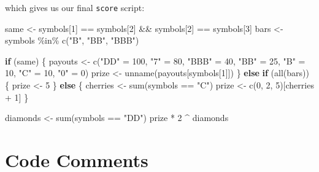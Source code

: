 \documentclass[
  letterpaper,
  DIV=11,
  numbers=noendperiod]{scrbook}
\newenvironment{Shaded}{\begin{snugshade}}{\end{snugshade}}
\newcommand{\ControlFlowTok}[1]{\textcolor[rgb]{0.00,0.23,0.31}{\textbf{#1}}}
\newcommand{\DecValTok}[1]{\textcolor[rgb]{0.68,0.00,0.00}{#1}}
\newcommand{\FunctionTok}[1]{\textcolor[rgb]{0.28,0.35,0.67}{#1}}
\newcommand{\NormalTok}[1]{\textcolor[rgb]{0.00,0.23,0.31}{#1}}
\newcommand{\OtherTok}[1]{\textcolor[rgb]{0.00,0.23,0.31}{#1}}
\newcommand{\SpecialCharTok}[1]{\textcolor[rgb]{0.37,0.37,0.37}{#1}}
\newcommand{\StringTok}[1]{\textcolor[rgb]{0.13,0.47,0.30}{#1}}
\begin{document}
which gives us our final \texttt{score} script:

\begin{Shaded}
\begin{Highlighting}[]
\NormalTok{same }\OtherTok{\textless{}{-}}\NormalTok{ symbols[}\DecValTok{1}\NormalTok{] }\SpecialCharTok{==}\NormalTok{ symbols[}\DecValTok{2}\NormalTok{] }\SpecialCharTok{\&\&}\NormalTok{ symbols[}\DecValTok{2}\NormalTok{] }\SpecialCharTok{==}\NormalTok{ symbols[}\DecValTok{3}\NormalTok{]}
\NormalTok{bars }\OtherTok{\textless{}{-}}\NormalTok{ symbols }\SpecialCharTok{\%in\%} \FunctionTok{c}\NormalTok{(}\StringTok{"B"}\NormalTok{, }\StringTok{"BB"}\NormalTok{, }\StringTok{"BBB"}\NormalTok{)}

\ControlFlowTok{if}\NormalTok{ (same) \{}
\NormalTok{  payouts }\OtherTok{\textless{}{-}} \FunctionTok{c}\NormalTok{(}\StringTok{"DD"} \OtherTok{=} \DecValTok{100}\NormalTok{, }\StringTok{"7"} \OtherTok{=} \DecValTok{80}\NormalTok{, }\StringTok{"BBB"} \OtherTok{=} \DecValTok{40}\NormalTok{, }\StringTok{"BB"} \OtherTok{=} \DecValTok{25}\NormalTok{, }
    \StringTok{"B"} \OtherTok{=} \DecValTok{10}\NormalTok{, }\StringTok{"C"} \OtherTok{=} \DecValTok{10}\NormalTok{, }\StringTok{"0"} \OtherTok{=} \DecValTok{0}\NormalTok{)}
\NormalTok{  prize }\OtherTok{\textless{}{-}} \FunctionTok{unname}\NormalTok{(payouts[symbols[}\DecValTok{1}\NormalTok{]])}
\NormalTok{\} }\ControlFlowTok{else} \ControlFlowTok{if}\NormalTok{ (}\FunctionTok{all}\NormalTok{(bars)) \{}
\NormalTok{  prize }\OtherTok{\textless{}{-}} \DecValTok{5}
\NormalTok{\} }\ControlFlowTok{else}\NormalTok{ \{}
\NormalTok{  cherries }\OtherTok{\textless{}{-}} \FunctionTok{sum}\NormalTok{(symbols }\SpecialCharTok{==} \StringTok{"C"}\NormalTok{)}
\NormalTok{  prize }\OtherTok{\textless{}{-}} \FunctionTok{c}\NormalTok{(}\DecValTok{0}\NormalTok{, }\DecValTok{2}\NormalTok{, }\DecValTok{5}\NormalTok{)[cherries }\SpecialCharTok{+} \DecValTok{1}\NormalTok{]}
\NormalTok{\}}

\NormalTok{diamonds }\OtherTok{\textless{}{-}} \FunctionTok{sum}\NormalTok{(symbols }\SpecialCharTok{==} \StringTok{"DD"}\NormalTok{)}
\NormalTok{prize }\SpecialCharTok{*} \DecValTok{2} \SpecialCharTok{\^{}}\NormalTok{ diamonds}
\end{Highlighting}
\end{Shaded}

\section{Code Comments}\label{code-comments}
\end{document}
